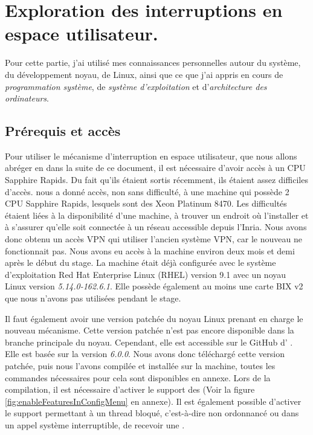\section{Exploration des interruptions en espace utilisateur.}
\label{sec:exploreUintr}

Pour cette partie, j'ai utilisé mes connaissances personnelles autour du système, du développement noyau, de Linux, ainsi que ce que j'ai appris en cours de \emph{programmation système}, de \emph{système d'exploitation} et d'\emph{architecture des ordinateurs}.

\subsection{Prérequis et accès}
\label{requirements}

Pour utiliser le mécanisme d'interruption en espace utilisateur, que nous allons abréger en \uintr{} dans la suite de ce document,
il est nécessaire d'avoir accès à un CPU \intel{} Sapphire Rapids.
Du fait qu'ils étaient sortis récemment, ils étaient assez difficiles d'accès.
\atos{} nous a donné accès, non sans difficulté, à une machine qui possède 2 CPU \intel{} Sapphire Rapids, lesquels sont des \intel{} Xeon\textsuperscript{\tiny{\textregistered}} Platinum 8470.
Les difficultés étaient liées à la disponibilité d'une machine, à trouver un endroit où l'installer et à s'assurer qu'elle soit connectée à un réseau accessible depuis l'Inria.
Nous avons donc obtenu un accès VPN qui utiliser l'ancien système VPN, car le nouveau ne fonctionnait pas.
Nous avons eu accès à la machine environ deux mois et demi après le début du stage.
La machine était déjà configurée avec le système d'exploitation Red Hat Enterprise Linux (RHEL) version 9.1 avec un noyau Linux version \emph{5.14.0-162.6.1}.
Elle possède également au moins une carte BIX v2 que nous n'avons pas utilisées pendant le stage. %

Il faut également avoir une version patchée du noyau Linux prenant en charge le nouveau mécanisme.
Cette version patchée n'est pas encore disponible dans la branche principale du noyau.
Cependant, elle est accessible sur le GitHub d'\intel{} \cite{intelUintrLinuxKernel}.
Elle est basée sur la version \emph{6.0.0}.
Nous avons donc téléchargé cette version patchée, puis nous l'avons compilée et installée sur la machine, toutes les commandes nécessaires pour cela sont disponibles en annexe.
Lors de la compilation, il est nécessaire d'activer le support des \uintr{} (Voir la figure \ref{fig:enableFeaturesInConfigMenu} en annexe).
Il est également possible d'activer le support permettant à un thread bloqué, c'est-à-dire non ordonnancé ou dans un appel système interruptible, de recevoir une \uintr{}.

